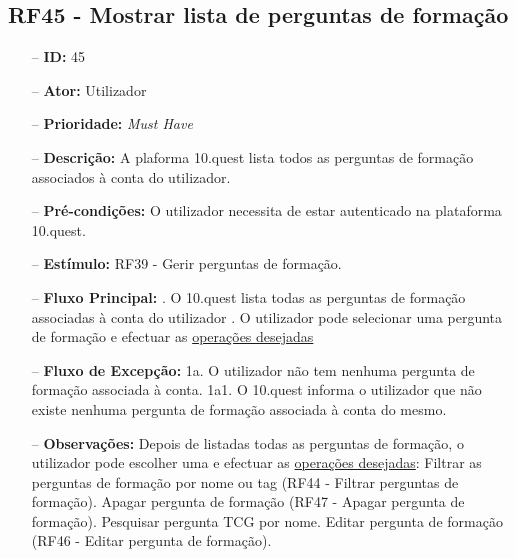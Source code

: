 \subsection{RF45 - Mostrar lista de perguntas de formação}
\begin{itemize}
	\item[--] \textbf{ID:} 45
	\item[--]  \textbf{Ator:} Utilizador
	\item[--]  \textbf{Prioridade:} \textit{Must Have}
	\item[--]  \textbf{Descrição:} A plaforma 10.quest lista todos as perguntas de formação associados à conta do utilizador.
	\item[--]  \textbf{Pré-condições:} O utilizador necessita de estar autenticado na plataforma 10.quest.
	\item[--]  \textbf{Estímulo:} RF39 - Gerir perguntas de formação.
	\item[--]  \textbf{Fluxo Principal:} 
	. O 10.quest lista todas as perguntas de formação associadas à conta do utilizador
	. O utilizador pode selecionar uma pergunta de formação e efectuar as \underline{operações desejadas}
	\item[--]  \textbf{Fluxo de Excepção:} 
	\subitem 1a. O utilizador não tem nenhuma pergunta de formação associada à conta.
	\subitem 1a1. O 10.quest informa o utilizador que não existe nenhuma pergunta de formação associada à conta do mesmo.
	\item[--]  \textbf{Observações:} Depois de listadas todas as perguntas de formação, o utilizador pode escolher uma e efectuar as \underline{operações desejadas}:
	\subitem Filtrar as perguntas de formação por nome ou tag (RF44 - Filtrar perguntas de formação).
	\subitem Apagar pergunta de formação (RF47 - Apagar pergunta de formação).
	\subitem Pesquisar pergunta TCG por nome.
	\subitem Editar pergunta de formação (RF46 - Editar pergunta de formação).
\end{itemize}
\newpage

